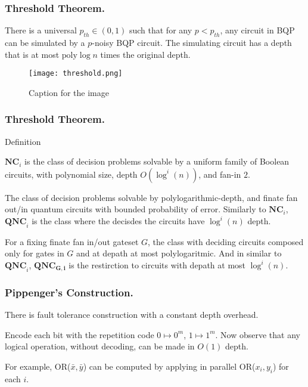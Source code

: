 \documentclass{beamer}
\newcommand*{\QNC}{ \mathbf{QNC} }
\newcommand*{\QNCG}{ \mathbf{QNC_G} }
\newcommand*{\NC}{\mathbf{NC}}
\newcommand*{\QNCiG}{\mathbf{QNC_{G,i}}}
\begin{document}
\begin{frame}
  \frametitle{Threshold Theorem.} 
  \begin{theorem}
There is a universal $p_{th} \in (0,1)$ such that for any $p < p_{th}$, any circuit in BQP can be simulated by a $p$-noisy BQP circuit. The simulating circuit has a depth that is at most $\text{poly} \log n$ times the original depth.
  \end{theorem}

\begin{figure}[h]
    \centering
    \texttt{[image: threshold.png]}
    \caption{Caption for the image}
    \label{fig:your-label}
\end{figure}
\end{frame}

\begin{frame}
  \frametitle{Threshold Theorem.} 

\end{frame}


\begin{frame}{Definition}
\begin{definition}[$\NC$ - Nick's Class]
$\NC_i$ is the class of decision problems solvable by a uniform family of Boolean circuits, with polynomial size, depth $O(\log^i(n))$, and fan-in $2$. 
\end{definition}

\begin{definition}[$\QNC$]
  The class of decision problems solvable by polylogarithmic-depth, and finate fan out/in quantum circuits with bounded probability of error. Similarly to $\NC_i$, $\QNC_i$ is the class where the decisdes the circuits have $\log^i (n)$ depth.  
\end{definition}

\begin{definition}[$\QNCG$]
  For a fixing finate fan in/out gateset $G$, the class with deciding circuits composed only for gates in $G$ and at depath at most polylogaritmic. And in similar to $\QNC_{i}$, $\QNCiG$ is the restirction to circuits with depath at most $\log^{i}(n)$.  
\end{definition}
\end{frame}

\begin{frame}
  \frametitle{Pippenger's Construction.} 
  
  \begin{theorem}
    There is fault tolerance construction with a constant depth overhead.
  \end{theorem}
Encode each bit with the repetition code $0 \mapsto 0^{m}$, $1 \mapsto 1^{m}$. Now observe that any logical operation, without decoding, can be made in $O(1)$ depth.

For example, OR($\bar{x}, \bar{y}$) can be computed by applying in parallel OR($x_{i}, y_{i}$) for each $i$.

\end{frame}
\end{document}
